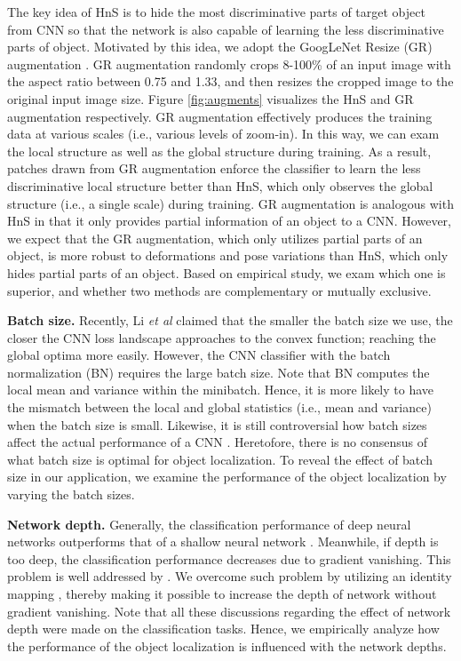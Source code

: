 \documentclass{bmvc2k}
\def\etal{\emph{et al}\bmvaOneDot}
\begin{document}
The key idea of HnS is to hide the most discriminative parts of target object from CNN so that the network is also capable of learning the less discriminative parts of object. Motivated by this idea, we adopt the GoogLeNet Resize (GR) augmentation \cite{szegedy2015going}. GR augmentation randomly crops 8-100\% of an input image with the aspect ratio between 0.75 and 1.33, and then resizes the cropped image to the original input image size. Figure \ref{fig:augments} visualizes the HnS and GR augmentation respectively. GR augmentation effectively produces the training data at various scales (i.e., various levels of zoom-in). In this way, we can exam the local structure as well as the global structure during training. As a result, patches drawn from GR augmentation enforce the classifier to learn the less discriminative local structure better than HnS, which only observes the global structure (i.e., a single scale) during training. GR augmentation is analogous with HnS in that it only provides partial information of an object to a CNN. However, we expect that the GR augmentation, which only utilizes partial parts of an object, is more robust to deformations and pose variations than HnS, which only hides partial parts of an object. Based on empirical study, we exam which one is superior, and whether two methods are complementary or mutually exclusive.


\textbf{Batch size.} Recently, Li \etal \cite{li2017visualizing} claimed that the smaller the batch size we use, the closer the CNN loss landscape approaches to the convex function; reaching the global optima more easily. However, the CNN classifier with the batch normalization (BN) \cite{ioffe2015batch} requires the large batch size. Note that BN computes the local mean and variance within the minibatch. Hence, it is more likely to have the mismatch between the local and global statistics (i.e., mean and variance) when the batch size is small. Likewise, it is still controversial how batch sizes affect the actual performance of a CNN \cite{chaudhari2016entropy, keskar2016large, dinh2017sharp}. Heretofore, there is no consensus of what batch size is optimal for object localization. To reveal the effect of batch size in our application, we examine the performance of the object localization by varying the batch sizes. 

\textbf{Network depth.} Generally, the classification performance of deep neural networks outperforms that of a shallow neural network \cite{krizhevsky2012imagenet, simonyan2014very}. Meanwhile, if depth is too deep, the classification performance decreases due to gradient vanishing. This problem is well addressed by \cite{he2016deep, li2017visualizing}. We overcome such problem by utilizing an identity mapping \cite{he2016identity}, thereby making it possible to increase the depth of network without gradient vanishing. Note that all these discussions regarding the effect of network depth were made on the classification tasks. Hence, we empirically analyze how the performance of the object localization is influenced with the network depths. 
\end{document}
